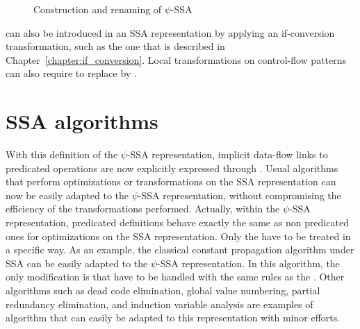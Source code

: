 \begin{figure}[h]
\footnotesize
{}\hfill
{} \hfill
{} \hfill
{}
\caption{Construction and renaming of $\psi$-SSA}
\label{fig:psi_ssa_construct}
\end{figure}


\psifuns can also be introduced in an SSA representation by
applying an if-conversion transformation, such as the one that is
described in Chapter~\ref{chapter:if_conversion}. Local transformations
on control-flow patterns can also require to replace \phifuns
by \psifuns.

\section{SSA algorithms}



With this definition of the $\psi$-SSA representation, implicit data-flow links to predicated operations are now explicitly expressed through \psifuns. Usual algorithms that perform
optimizations or transformations on the SSA representation can now be
easily adapted to the $\psi$-SSA representation, without compromising
the efficiency of the transformations performed. Actually, within the
$\psi$-SSA representation, predicated definitions behave exactly the
same as non predicated ones for optimizations on the SSA
representation. Only the \psifuns have to be treated in a
specific way. As an example, the classical constant propagation
algorithm under SSA can be easily adapted to the $\psi$-SSA
representation. In this algorithm, the only modification is that
\psifuns have to be handled with the same rules as the \phifuns. Other algorithms such as dead code elimination, global
value numbering, partial redundancy elimination, and induction
variable analysis are examples of algorithm that can easily be adapted
to this representation with minor efforts.

